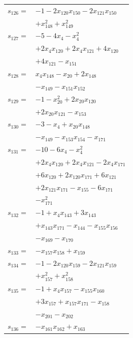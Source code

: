 \begin{longtable}{@{}r@{\;}l@{}}
\(s_{126}=\) & \(\displaystyle -1 -2x_{120}x_{150} -2x_{121}x_{150}\) \\
 & \(\displaystyle +x_{148}^{2} +x_{149}^{2}\) \\[3pt]
\(s_{127}=\) & \(\displaystyle -5 -4x_{4} -x_{4}^{2}\) \\
 & \(\displaystyle +2x_{4}x_{120} +2x_{4}x_{121} +4x_{120}\) \\
 & \(\displaystyle +4x_{121} -x_{151}\) \\[3pt]
\(s_{128}=\) & \(\displaystyle x_{4}x_{148} -x_{20} +2x_{148}\) \\
 & \(\displaystyle -x_{149} -x_{151}x_{152}\) \\[3pt]
\(s_{129}=\) & \(\displaystyle -1 -x_{20}^{2} +2x_{20}x_{120}\) \\
 & \(\displaystyle +2x_{20}x_{121} -x_{153}\) \\[3pt]
\(s_{130}=\) & \(\displaystyle -3 -x_{4} +x_{20}x_{148}\) \\
 & \(\displaystyle -x_{149} -x_{153}x_{154} -x_{171}\) \\[3pt]
\(s_{131}=\) & \(\displaystyle -10 -6x_{4} -x_{4}^{2}\) \\
 & \(\displaystyle +2x_{4}x_{120} +2x_{4}x_{121} -2x_{4}x_{171}\) \\
 & \(\displaystyle +6x_{120} +2x_{120}x_{171} +6x_{121}\) \\
 & \(\displaystyle +2x_{121}x_{171} -x_{155} -6x_{171}\) \\
 & \(\displaystyle -x_{171}^{2}\) \\[3pt]
\(s_{132}=\) & \(\displaystyle -1 +x_{4}x_{143} +3x_{143}\) \\
 & \(\displaystyle +x_{143}x_{171} -x_{144} -x_{155}x_{156}\) \\
 & \(\displaystyle -x_{169} -x_{170}\) \\[3pt]
\(s_{133}=\) & \(\displaystyle -x_{157}x_{158} +x_{159}\) \\[3pt]
\(s_{134}=\) & \(\displaystyle -1 -2x_{120}x_{159} -2x_{121}x_{159}\) \\
 & \(\displaystyle +x_{157}^{2} +x_{158}^{2}\) \\[3pt]
\(s_{135}=\) & \(\displaystyle -1 +x_{4}x_{157} -x_{155}x_{160}\) \\
 & \(\displaystyle +3x_{157} +x_{157}x_{171} -x_{158}\) \\
 & \(\displaystyle -x_{201} -x_{202}\) \\[3pt]
\(s_{136}=\) & \(\displaystyle -x_{161}x_{162} +x_{163}\) \\[3pt]

\end{longtable}
